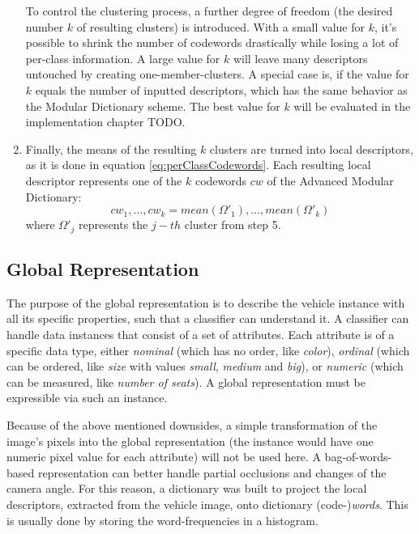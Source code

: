 \begin{enumerate}
To control the clustering process, a further degree of freedom (the desired number $k$ of resulting clusters) is introduced. With a small value for $k$, it's possible to shrink the number of codewords drastically while losing a lot of per-class information. A large value for $k$ will leave many descriptors untouched by creating one-member-clusters. A special case is, if the value for $k$ equals the number of inputted descriptors, which has the same behavior as the Modular Dictionary scheme. The best value for $k$ will be evaluated in the implementation chapter TODO.
	\item Finally, the means of the resulting $k$ clusters are turned into local descriptors, as it is done in equation \ref{eq:perClassCodewords}. Each resulting local descriptor represents one of the $k$ codewords $cw$ of the Advanced Modular Dictionary:
	\begin{equation}\label{eq:finalCodewords}
	{cw}_1,\dots,{cw}_k = mean({\Omega'}_1),\dots,mean({\Omega'}_k)
	\end{equation}
where ${\Omega'}_j$ represents the $j-th$ cluster from step 5.
\end{enumerate}

\subsection{Global Representation}\label{sec:globalRepresentationConcept}
The purpose of the global representation is to describe the vehicle instance with all its specific properties, such that a classifier can understand it. A classifier can handle data instances that consist of a set of attributes. Each attribute is of a specific data type, either \emph{nominal} (which has no order, like \emph{color}), \emph{ordinal} (which can be ordered, like \emph{size} with values \emph{small}, \emph{medium} and \emph{big}), or \emph{numeric} (which can be measured, like \emph{number of seats}). A global representation must be expressible via such an instance.

Because of the above mentioned downsides, a simple transformation of the image's pixels into the global representation (the instance would have one numeric pixel value for each attribute) will not be used here. A bag-of-words-based representation can better handle partial occlusions and changes of the camera angle. For this reason, a dictionary was built to project the local descriptors, extracted from the vehicle image, onto dictionary (code-)\emph{words}. This is usually done by storing the word-frequencies in a histogram.

